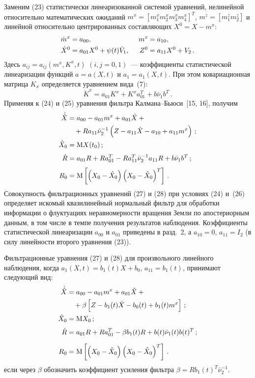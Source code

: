 \begin{multicols}{2}
Заменим (23) статистически линеаризованной системой уравнений, нелинейной 
относительно математических ожиданий $m^x =\left[ m_1^x m_2^x m_3^x 
m_4^x\right]^T$, $m^z=\left[ m_1^z m_2^z\right]$ и линейной относительно 
центрированных составляющих $X^0 = X-m^x$:
\begin{align}
 \dot m^x &= a_{00},&\enskip m^z &= a_{10},\label{e42}\\
 \dot X^0 &= a_{01} X^0 +\psi (t) \bar V_1,&\enskip Z^0 &= a_{11} X^0 + V_2\,.\label{e43}
\end{align}
Здесь $a_{ij} = a_{ij} \left(m^x, K^x,t\right)$ $(i,j=0,1)$~--- коэффициенты
статистической линеаризации функций $a=a(X,t)$ и $a_1= a_1 (X,t)$.
При этом ковариационная матрица $K_x$ определяется уравнением вида~(7):
 \begin{equation}
 \dot K^x = a_{01} K^x + K^x a_{01}^T + b\bar\nu_1 b^T\,.\label{e44}
 \end{equation}
Применяя к (24) и (25) уравнения фильтра Кал\-ма\-на--Бью\-си~[15, 16],
получим
\begin{align}
 {\dot{\hat X}} &= a_{00} - a_{01} m^x + a_{01} \hat X +{}\notag\\
 &\hspace*{10pt}{}+ R a_{11} \bar\nu_2^{-1}\left(Z-a_{11} \hat X - a_{10} + a_{11} m^x\right)\,;\label{e45}\\
\hat X_0 &={\rm M} X(t_0)\,;\notag\\[3pt]
 \dot R &= a_{01} R + R a_{01}^T - R a_{11}^T \bar \nu_2^{-1} a_{11} R + b\bar \nu_1 b^T\,;\notag\\[-6pt]
&\label{e46}\\[-6pt]
 R_0 &={\rm M} \left[ \left(X_0 -\hat X_0\right)\left(X_0 -\hat X_0\right)^T\right]\,.\notag
\end{align}
Совокупность фильтрационных уравнений (27) и (28) при условиях (24) и~(26)
определяет искомый квазилинейный нормальный фильтр для обработки информации
о флуктуациях неравномерности вращения Земли по апостериорным данным,
в том числе в темпе получения результатов наблюдения. Коэффициенты
статистической линеаризации $a_{00}$ и $a_{01}$ приведены в разд.~2,
а $a_{10}=0$, $ a_{11} = I_2$ (в силу линейности второго уравнения (23)).

Фильтрационные уравнения (27) и (28) для произвольного линейного
наблюдения, когда $a_1(X,t) = b_1 (t) X + b_0$, $ a_{11} = b_1 (t)$,
принимают следующий вид:
\begin{align}
 {\dot{\hat X}} &= a_{00} - a_{01} m^x + a_{01} \hat X +{}\notag \\
 &\hspace*{10pt}{}+\beta \left[ Z- b_1(t) \hat X -b_0(t) + b_1(t) m^x\right] \,;\label{e47}\\
 \hat X_0& ={\rm M} X_0\,;\notag\\[3pt]
 \dot R &= a_{01} R + R a_{01}^T - \beta b_1(t) R + b(t) \bar\nu_1 (t) b(t)^T\,;\notag\\[-3pt]
 \label{e48}\\[-6pt]
 R_0 &={\rm M} \left[ \left(X_0 -\hat X_0\right)\left(X_0 -\hat X_0\right)^T\right]\,.\notag
\end{align}
если через $\beta$ обозначить коэффициент усиления фильтра
$\beta = R b_1 (t)^T \bar\nu_2^{-1}$.


\end{multicols}
